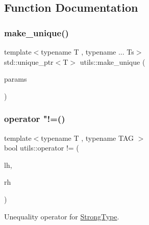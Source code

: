 \subsection{Function Documentation}
\mbox{\label{namespaceutils_a5d986c00482350e10d6088f787e1add3}} 
\subsubsection{\texorpdfstring{make\_unique()}{make\_unique()}}
{\footnotesize\ttfamily template$<$typename T , typename ... Ts$>$ \\
std\+::unique\+\_\+ptr$<$T$>$ utils\+::make\+\_\+unique (\begin{DoxyParamCaption}\item[{Ts \&\&...}]{params }\end{DoxyParamCaption})}

\mbox{\label{namespaceutils_a8acda383c497ae0fc6eff785ebaeb1ef}} 
\subsubsection{\texorpdfstring{operator "!=()}{operator !=()}}
{\footnotesize\ttfamily template$<$typename T , typename T\+AG $>$ \\
bool utils\+::operator != (\begin{DoxyParamCaption}\item[{\mbox{\hyperlink{classutils_1_1_strong_type}{Strong\+Type}}$<$ T, T\+AG $>$}]{lh,  }\item[{\mbox{\hyperlink{classutils_1_1_strong_type}{Strong\+Type}}$<$ T, T\+AG $>$}]{rh }\end{DoxyParamCaption})\hspace{0.3cm}{\ttfamily [inline]}}



Unequality operator for \mbox{\hyperlink{classutils_1_1_strong_type}{Strong\+Type}}. 

\mbox{\label{namespaceutils_a40fe8534b73b6f60778ed6822109fd33}} 
